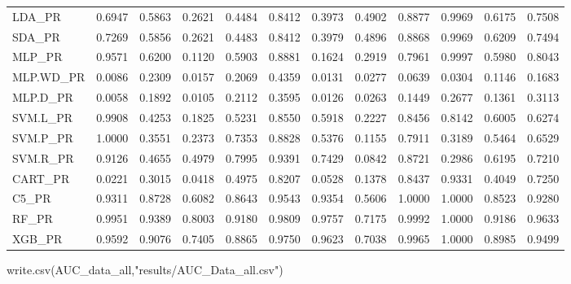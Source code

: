 \documentclass[
]{article}
\newenvironment{Shaded}{\begin{snugshade}}{\end{snugshade}}
\newcommand{\FunctionTok}[1]{\textcolor[rgb]{0.00,0.00,0.00}{#1}}
\newcommand{\NormalTok}[1]{#1}
\newcommand{\StringTok}[1]{\textcolor[rgb]{0.31,0.60,0.02}{#1}}
\begin{document}
\begin{longtable}[]{@{}lrrrrrrrrrrr@{}}
LDA\_PR & 0.6947 & 0.5863 & 0.2621 & 0.4484 & 0.8412 & 0.3973 & 0.4902 &
0.8877 & 0.9969 & 0.6175 & 0.7508 \\
SDA\_PR & 0.7269 & 0.5856 & 0.2621 & 0.4483 & 0.8412 & 0.3979 & 0.4896 &
0.8868 & 0.9969 & 0.6209 & 0.7494 \\
MLP\_PR & 0.9571 & 0.6200 & 0.1120 & 0.5903 & 0.8881 & 0.1624 & 0.2919 &
0.7961 & 0.9997 & 0.5980 & 0.8043 \\
MLP.WD\_PR & 0.0086 & 0.2309 & 0.0157 & 0.2069 & 0.4359 & 0.0131 &
0.0277 & 0.0639 & 0.0304 & 0.1146 & 0.1683 \\
MLP.D\_PR & 0.0058 & 0.1892 & 0.0105 & 0.2112 & 0.3595 & 0.0126 & 0.0263
& 0.1449 & 0.2677 & 0.1361 & 0.3113 \\
SVM.L\_PR & 0.9908 & 0.4253 & 0.1825 & 0.5231 & 0.8550 & 0.5918 & 0.2227
& 0.8456 & 0.8142 & 0.6005 & 0.6274 \\
SVM.P\_PR & 1.0000 & 0.3551 & 0.2373 & 0.7353 & 0.8828 & 0.5376 & 0.1155
& 0.7911 & 0.3189 & 0.5464 & 0.6529 \\
SVM.R\_PR & 0.9126 & 0.4655 & 0.4979 & 0.7995 & 0.9391 & 0.7429 & 0.0842
& 0.8721 & 0.2986 & 0.6195 & 0.7210 \\
CART\_PR & 0.0221 & 0.3015 & 0.0418 & 0.4975 & 0.8207 & 0.0528 & 0.1378
& 0.8437 & 0.9331 & 0.4049 & 0.7250 \\
C5\_PR & 0.9311 & 0.8728 & 0.6082 & 0.8643 & 0.9543 & 0.9354 & 0.5606 &
1.0000 & 1.0000 & 0.8523 & 0.9280 \\
RF\_PR & 0.9951 & 0.9389 & 0.8003 & 0.9180 & 0.9809 & 0.9757 & 0.7175 &
0.9992 & 1.0000 & 0.9186 & 0.9633 \\
XGB\_PR & 0.9592 & 0.9076 & 0.7405 & 0.8865 & 0.9750 & 0.9623 & 0.7038 &
0.9965 & 1.0000 & 0.8985 & 0.9499 \\
\bottomrule()
\end{longtable}

\begin{Shaded}
\begin{Highlighting}[]
\FunctionTok{write.csv}\NormalTok{(AUC\_data\_all,}\StringTok{"results/AUC\_Data\_all.csv"}\NormalTok{)}
\end{Highlighting}
\end{Shaded}
\end{document}
